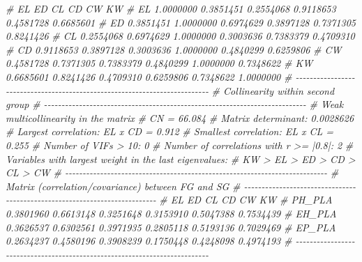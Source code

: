 \documentclass[
]{book}
\newenvironment{Shaded}{\begin{snugshade}}{\end{snugshade}}
\newcommand{\CommentTok}[1]{\textcolor[rgb]{0.56,0.35,0.01}{\textit{#1}}}
\numberwithin{equation}{section}
\begin{document}
\begin{Shaded}
\begin{Highlighting}[]
\CommentTok{\#           EL        ED        CL        CD        CW        KW}
\CommentTok{\# EL 1.0000000 0.3851451 0.2554068 0.9118653 0.4581728 0.6685601}
\CommentTok{\# ED 0.3851451 1.0000000 0.6974629 0.3897128 0.7371305 0.8241426}
\CommentTok{\# CL 0.2554068 0.6974629 1.0000000 0.3003636 0.7383379 0.4709310}
\CommentTok{\# CD 0.9118653 0.3897128 0.3003636 1.0000000 0.4840299 0.6259806}
\CommentTok{\# CW 0.4581728 0.7371305 0.7383379 0.4840299 1.0000000 0.7348622}
\CommentTok{\# KW 0.6685601 0.8241426 0.4709310 0.6259806 0.7348622 1.0000000}
\CommentTok{\# {-}{-}{-}{-}{-}{-}{-}{-}{-}{-}{-}{-}{-}{-}{-}{-}{-}{-}{-}{-}{-}{-}{-}{-}{-}{-}{-}{-}{-}{-}{-}{-}{-}{-}{-}{-}{-}{-}{-}{-}{-}{-}{-}{-}{-}{-}{-}{-}{-}{-}{-}{-}{-}{-}{-}{-}{-}{-}{-}{-}{-}{-}{-}{-}{-}{-}{-}{-}{-}{-}{-}{-}{-}{-}{-}}
\CommentTok{\# Collinearity within second group }
\CommentTok{\# {-}{-}{-}{-}{-}{-}{-}{-}{-}{-}{-}{-}{-}{-}{-}{-}{-}{-}{-}{-}{-}{-}{-}{-}{-}{-}{-}{-}{-}{-}{-}{-}{-}{-}{-}{-}{-}{-}{-}{-}{-}{-}{-}{-}{-}{-}{-}{-}{-}{-}{-}{-}{-}{-}{-}{-}{-}{-}{-}{-}{-}{-}{-}{-}{-}{-}{-}{-}{-}{-}{-}{-}{-}{-}{-}}
\CommentTok{\# Weak multicollinearity in the matrix}
\CommentTok{\# CN = 66.084}
\CommentTok{\# Matrix determinant: 0.0028626 }
\CommentTok{\# Largest correlation: EL x CD = 0.912 }
\CommentTok{\# Smallest correlation: EL x CL = 0.255 }
\CommentTok{\# Number of VIFs \textgreater{} 10: 0 }
\CommentTok{\# Number of correlations with r \textgreater{}= |0.8|: 2 }
\CommentTok{\# Variables with largest weight in the last eigenvalues: }
\CommentTok{\# KW \textgreater{} EL \textgreater{} ED \textgreater{} CD \textgreater{} CL \textgreater{} CW }
\CommentTok{\# {-}{-}{-}{-}{-}{-}{-}{-}{-}{-}{-}{-}{-}{-}{-}{-}{-}{-}{-}{-}{-}{-}{-}{-}{-}{-}{-}{-}{-}{-}{-}{-}{-}{-}{-}{-}{-}{-}{-}{-}{-}{-}{-}{-}{-}{-}{-}{-}{-}{-}{-}{-}{-}{-}{-}{-}{-}{-}{-}{-}{-}{-}{-}{-}{-}{-}{-}{-}{-}{-}{-}{-}{-}{-}{-}}
\CommentTok{\# Matrix (correlation/covariance) between FG and SG}
\CommentTok{\# {-}{-}{-}{-}{-}{-}{-}{-}{-}{-}{-}{-}{-}{-}{-}{-}{-}{-}{-}{-}{-}{-}{-}{-}{-}{-}{-}{-}{-}{-}{-}{-}{-}{-}{-}{-}{-}{-}{-}{-}{-}{-}{-}{-}{-}{-}{-}{-}{-}{-}{-}{-}{-}{-}{-}{-}{-}{-}{-}{-}{-}{-}{-}{-}{-}{-}{-}{-}{-}{-}{-}{-}{-}{-}{-}}
\CommentTok{\#               EL        ED        CL        CD        CW        KW}
\CommentTok{\# PH\_PLA 0.3801960 0.6613148 0.3251648 0.3153910 0.5047388 0.7534439}
\CommentTok{\# EH\_PLA 0.3626537 0.6302561 0.3971935 0.2805118 0.5193136 0.7029469}
\CommentTok{\# EP\_PLA 0.2634237 0.4580196 0.3908239 0.1750448 0.4248098 0.4974193}
\CommentTok{\# {-}{-}{-}{-}{-}{-}{-}{-}{-}{-}{-}{-}{-}{-}{-}{-}{-}{-}{-}{-}{-}{-}{-}{-}{-}{-}{-}{-}{-}{-}{-}{-}{-}{-}{-}{-}{-}{-}{-}{-}{-}{-}{-}{-}{-}{-}{-}{-}{-}{-}{-}{-}{-}{-}{-}{-}{-}{-}{-}{-}{-}{-}{-}{-}{-}{-}{-}{-}{-}{-}{-}{-}{-}{-}{-}}

\end{Highlighting}
\end{Shaded}
\end{document}
